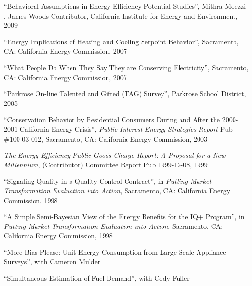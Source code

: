 \documentclass[Computer Science]{vita}
\begin{document}
\begin{vita}
\begin{Publications}
\begin{Unrefereed Public Reports}
    \item ``Behavioral Assumptions in Energy Efficiency Potential
      Studies'', Mithra Moezzi , James Woods Contributor, California
      Institute for Energy and Environment, 2009

    \item ``Energy Implications of Heating and Cooling Setpoint
      Behavior'', Sacramento, CA: California Energy Commission, 2007

    \item ``What People Do When They Say They are Conserving
      Electricity'', Sacramento, CA: California Energy Commission,
      2007

    \item ``Parkrose On-line Talented and Gifted (TAG) Survey'',
      Parkrose School District, 2005

    \item ``Conservation Behavior by Residential Consumers During and
      After the 2000-2001 California Energy Crisis'', \emph{Public
        Interest Energy Strategies Report} Pub \#100-03-012,
      Sacramento, CA: California Energy Commission, 2003

    \item \emph{The Energy Efficiency Public Goods Charge Report: A
        Proposal for a New Millennium}, (Contributor) Committee Report
      Pub 1999-12-08, 1999
	
    \item ``Signaling Quality in a Quality Control Contract'', in
      \emph{Putting Market Transformation Evaluation into Action},
      Sacramento, CA: California Energy Commission, 1998
	
    \item ``A Simple Semi-Bayesian View of the Energy Benefits for the
      IQ+ Program'', in \emph{Putting Market Transformation Evaluation
        into Action}, Sacramento, CA: California Energy Commission,
      1998
	
    \end{Unrefereed Public Reports}
  
    \begin{Work in progress}
\item ``More Bias Please: Unit Energy Consumption from Large Scale Appliance Surveys'', with Cameron Mulder

\item ``Simultaneous Estimation of Fuel Demand'', with Cody Fuller
 




\end{Work in progress}
\end{Publications}
\end{vita}
\end{document}
